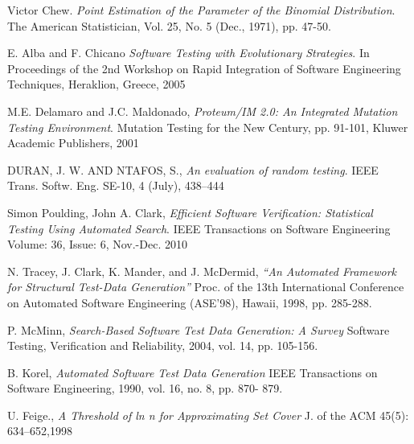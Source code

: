 \documentclass[journal]{IEEEtran}
\begin{document}
%
%
%
\begin{thebibliography}{1}
Victor Chew. 
\textit{Point Estimation of the Parameter of the Binomial Distribution}. 
The American Statistician, Vol. 25, No. 5 (Dec., 1971), pp. 47-50.

E. Alba and F. Chicano 
\textit{Software Testing with Evolutionary Strategies}. 
In Proceedings of the 2nd Workshop on Rapid Integration of Software Engineering Techniques, Heraklion, Greece, 2005 

M.E. Delamaro and J.C. Maldonado, 
\textit{Proteum/IM 2.0: An Integrated Mutation Testing Environment}. 
Mutation Testing for the New Century, pp. 91-101, Kluwer Academic Publishers, 2001

DURAN, J. W. AND NTAFOS, S., 
\textit{An evaluation of random testing}. 
IEEE Trans. Softw. Eng. SE-10, 4 (July), 438–444

Simon Poulding, John A. Clark, 
\textit{Efficient Software Verification: Statistical Testing Using Automated Search}. 
IEEE Transactions on Software Engineering  Volume: 36, Issue: 6, Nov.-Dec. 2010 

N. Tracey, J. Clark, K. Mander, and J. McDermid,
\textit{“An Automated Framework for Structural Test-Data Generation”}
Proc. of the 13th International Conference on Automated Software Engineering (ASE’98), Hawaii, 1998, pp. 285-288.

P. McMinn,
\textit{Search-Based Software Test Data Generation: A Survey}
Software Testing, Verification and Reliability, 2004, vol. 14, pp. 105-156.

B. Korel, 
\textit{Automated Software Test Data Generation}
IEEE Transactions on Software Engineering, 1990, vol. 16, no. 8, pp. 870-
879.

U. Feige., 
\textit{A Threshold of ln n for Approximating Set Cover}
J. of the ACM 45(5): 634–652,1998


\end{thebibliography}
\end{document}
